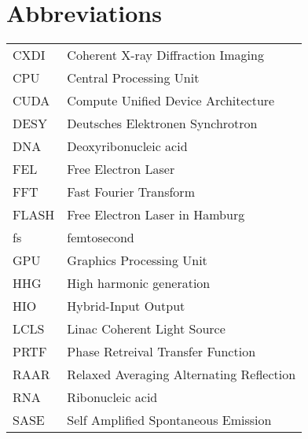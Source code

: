 \chapter*{Abbreviations}\label{sec:abrv}

\begin{tabular}{ll}
CXDI    &Coherent X-ray Diffraction Imaging\\
CPU     &Central Processing Unit\\
CUDA    &Compute Unified Device Architecture\\
DESY    &Deutsches Elektronen Synchrotron\\
DNA     &Deoxyribonucleic acid\\
FEL     &Free Electron Laser\\
FFT     &Fast Fourier Transform\\
FLASH   &Free Electron Laser in Hamburg\\
fs      &femtosecond\\
GPU     &Graphics Processing Unit\\
HHG     &High harmonic generation\\
HIO     &Hybrid-Input Output\\
LCLS    &Linac Coherent Light Source\\
PRTF    &Phase Retreival Transfer Function\\
RAAR    &Relaxed Averaging Alternating Reflection\\
RNA     &Ribonucleic acid\\
SASE    &Self Amplified Spontaneous Emission\\  

\end{tabular}
